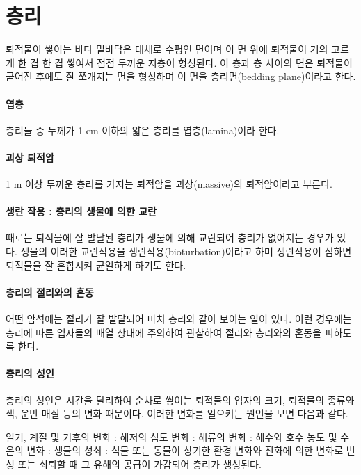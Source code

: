 \documentclass[12pt, a4paper, twoside]{book}
\begin{document}
	\clearpage
	\section{층리}



		퇴적물이 쌓이는 바다 밑바닥은 대체로 수평인 면이며 이 면 위에 퇴적물이 거의 고르게 한 겹 한 겹 쌓여서 점점 두꺼운 지층이 형성된다.
		이 층과 층 사이의 면은 퇴적물이 굳어진 후에도 잘 쪼개지는 면을 형성하며 이 면을 층리면(bedding plane)이라고 한다.

		\paragraph{엽층}
			층리들 중 두께가 1 cm 이하의 얇은 층리를 엽층(lamina)이라 한다.

		\paragraph{괴상 퇴적암}
			1 m 이상 두꺼운 층리를 가지는 퇴적암을 괴상(massive)의 퇴적암이라고 부른다.


		\paragraph{생란 작용 : 층리의 생물에 의한 교란  }
			때로는 퇴적물에 잘 발달된 층리가 생물에 의해 교란되어 층리가 없어지는 경우가 있다.
		생물의 이러한 교란작용을 생란작용(bioturbation)이라고 하며 생란작용이 심하면 퇴적물을 잘 혼합시켜 균일하게 하기도 한다.

		\paragraph{층리의 절리와의 혼동}
			어떤 암석에는 절리가 잘 발달되어 마치 층리와 같아 보이는 일이 있다.
			이런 경우에는 층리에 따른 입자들의 배열 상태에 주의하여 관찰하여 절리와 층리와의 혼동을 피하도록 한다.


		\paragraph{층리의 성인}
			층리의 성인은 시간을 달리하여 순차로 쌓이는 퇴적물의 입자의 크기, 퇴적물의 종류와 색, 운반 매질 등의 변화 때문이다.
			이러한 변화를 일으키는 원인을 보면 다음과 같다.

일기, 계절 및 기후의 변화 :
해저의 심도 변화 :
해류의 변화 :
해수와 호수 농도 및 수온의 변화 :
생물의 성쇠  : 식물 또는 동물이 상기한 환경 변화와 진화에 의한 변화로 번성 또는 쇠퇴할 때 그 유해의 공급이 가감되어 층리가 생성된다.
\end{document}
